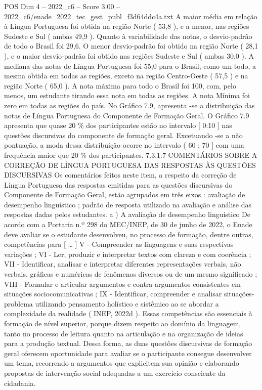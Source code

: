 \begin{textsample}{POS Dim 4 – 2022\_c6 – Score 3.00 – 2022\_c6/enade\_2022\_tec\_gest\_publ\_f3d64ddc4a.txt}
A maior média em relação à Língua Portuguesa foi obtida na região Norte ( 53,8 ), e a menor, nas regiões Sudeste e Sul ( ambas 49,9 ).
Quanto à variabilidade das notas, o desvio-padrão de todo o Brasil foi 29,6.
O menor desvio-padrão foi obtido na região Norte ( 28,1 ), e o maior desvio-padrão foi obtido nas regiões Sudeste e Sul ( ambas 30,0 ).
A mediana das notas de Língua Portuguesa foi 55,0 para o Brasil, como um todo, a mesma obtida em todas as regiões, exceto na região Centro-Oeste ( 57,5 ) e na região Norte ( 65,0 ).
A nota máxima para todo o Brasil foi 100, com, pelo menos, um estudante tirando essa nota em todas as regiões.
A nota Mínima foi zero em todas as regiões do país.
No Gráfico 7.9, apresenta -se a distribuição das notas de Língua Portuguesa do Componente de Formação Geral.
O Gráfico 7.9 apresenta que quase 20 \% dos participantes estão no intervalo [ 0:10 ] nas questões discursivas do componente de formação geral.
Excetuando -se a não pontuação, a moda dessa distribuição ocorre no intervalo ( 60 ; 70 ] com uma frequência maior que 20 \% dos participantes. 7.3.1.7 COMENTÁRIOS SOBRE A CORREÇÃO DE LÍNGUA PORTUGUESA DAS RESPOSTAS ÀS QUESTÕES DISCURSIVAS Os comentários feitos neste item, a respeito da correção de Língua Portuguesa das respostas emitidas para as questões discursivas do Componente de Formação Geral, estão agrupados em três eixos : avaliação de desempenho linguístico ; padrão de resposta utilizado na avaliação e análise das respostas dadas pelos estudantes. a ) A avaliação de desempenho linguístico De acordo com a Portaria n.º 298 do MEC/INEP, de 30 de junho de 2022, o Enade deve avaliar se o estudante desenvolveu, no processo de formação, dentre outras, competências para [ … ] V - Compreender as linguagens e suas respectivas variações ; VI - Ler, produzir e interpretar textos com clareza e com coerência ; VII - Identificar, analisar e interpretar diferentes representações verbais, não verbais, gráficas e numéricas de fenômenos diversos ou de um mesmo significado ; VIII - Formular e articular argumentos e contra-argumentos consistentes em situações sociocomunicativas ; IX - Identificar, compreender e analisar situações-problema utilizando pensamento holístico e sistêmico ao se abordar a complexidade da realidade ( INEP, 2022d ).
Essas competências são essenciais à formação de nível superior, porque dizem respeito ao domínio da linguagem, tanto no processo de leitura quanto na articulação e na organização de ideias para a produção textual.
Dessa forma, as duas questões discursivas de formação geral oferecem oportunidade para avaliar se o participante consegue desenvolver um tema, recorrendo a argumentos que explicitem sua opinião e elaborando propostas de intervenção social adequadas a um exercício consciente da cidadania.

\end{textsample}
